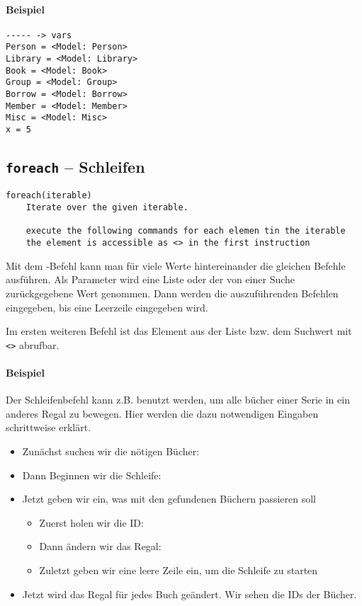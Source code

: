 \paragraph{Beispiel}
\begin{verbatim}
----- -> vars
Person = <Model: Person>
Library = <Model: Library>
Book = <Model: Book>
Group = <Model: Group>
Borrow = <Model: Borrow>
Member = <Model: Member>
Misc = <Model: Misc>
x = 5
\end{verbatim}

\subsection{\texttt{foreach} -- Schleifen}
\label{subsec:command_list:foreach}

\begin{verbatim}
foreach(iterable)
    Iterate over the given iterable.

    execute the following commands for each elemen tin the iterable
    the element is accessible as <> in the first instruction
\end{verbatim}

Mit dem -Befehl kann man für viele Werte hintereinander die gleichen Befehle ausführen. Als Parameter wird eine Liste oder der von einer Suche zurückgegebene Wert genommen. Dann werden die auszuführenden Befehlen eingegeben, bis eine Leerzeile eingegeben wird.

Im ersten weiteren Befehl ist das Element aus der Liste bzw. dem Suchwert mit \texttt{<>} abrufbar.

\paragraph{Beispiel}

Der Schleifenbefehl kann z.B. benutzt werden, um alle bücher einer Serie in ein anderes Regal zu bewegen. Hier werden die dazu notwendigen Eingaben schrittweise erklärt.

\begin{itemize}
\item Zunächst suchen wir die nötigen Bücher:\\ 
\item Dann Beginnen wir die Schleife: 
\item Jetzt geben wir ein, was mit den gefundenen Büchern passieren soll
\begin{itemize}
\item Zuerst holen wir die ID: 
\item Dann ändern wir das Regal: 
\item Zuletzt geben wir eine leere Zeile ein, um die Schleife zu starten
\end{itemize}
\item Jetzt wird das Regal für jedes Buch geändert. Wir sehen die IDs der Bücher.
\end{itemize}

